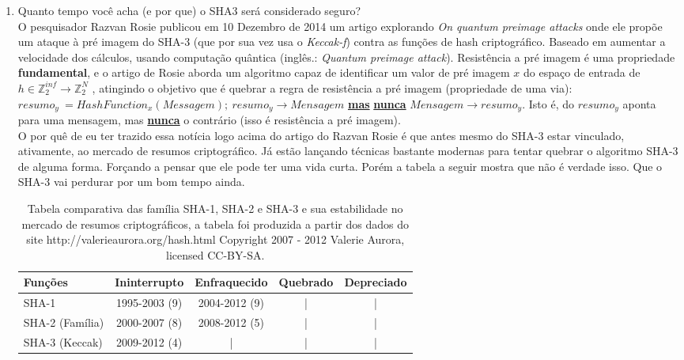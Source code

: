 \documentclass[12pt, a4paper]{article}
\begin{document}
\begin{enumerate}
\begin{enumerate}
    \item Quanto tempo você acha (e por que) o SHA3 será considerado seguro?\\

    O pesquisador Razvan Rosie publicou em 10 Dezembro de 2014 um artigo
    explorando \textit{On quantum preimage attacks} onde ele propõe um ataque à
    pré imagem do SHA-3 (que por sua vez usa o \textit{Keccak-f}) contra as
    funções de hash criptográfico. Baseado em aumentar a velocidade dos
    cálculos, usando computação quântica (inglês.: \textit{Quantum preimage
    attack}). Resistência a pré imagem é uma propriedade \textbf{fundamental}, e
    o artigo de Rosie aborda um algoritmo capaz de identificar um valor de pré
    imagem $x$ do espaço de entrada de $h \in \mathbb{Z}_{2}^{inf} \rightarrow
    \mathbb{Z}_{2}^{N}$ \cite{rosie14}, atingindo o objetivo que é quebrar a
    regra de resistência a pré imagem (propriedade de uma via): $resumo_y\ =
    HashFunction_x(Messagem);\ resumo_y \rightarrow Mensagem$
    \underline{\color{red} \textbf{mas}} \underline{\color{red} \textbf{nunca}}
    $Mensagem \rightarrow resumo_y$. Isto é, do $resumo_y$ aponta para uma
    mensagem, mas \textbf{\underline{nunca}} o contrário (isso é resistência a
    pré imagem).\\

    O por quê de eu ter trazido essa notícia logo acima do artigo do Razvan
    Rosie é que antes mesmo do SHA-3 estar vinculado, ativamente, ao mercado de
    resumos criptográfico. Já estão lançando técnicas bastante modernas para
    tentar quebrar o algoritmo SHA-3 de alguma forma. Forçando a pensar que ele
    pode ter uma vida curta. Porém a tabela a seguir mostra que não é verdade
    isso. Que o SHA-3 vai perdurar por um bom tempo ainda.\\

    \begin{table}[ht!]
      \centering
      \begin{tabular}{|l|c|c|c|c|}
        \hline Funções & Ininterrupto & Enfraquecido & Quebrado & Depreciado \\
        \hline SHA-1 & 1995-2003 (9) & 2004-2012 (9) & | & | \\
        \hline SHA-2 (Família) & 2000-2007 (8) & 2008-2012 (5) & | & | \\
        \hline SHA-3 (Keccak) & 2009-2012 (4) & | & | & | \\
        \hline
      \end{tabular}
      \caption{Tabela comparativa das família SHA-1, SHA-2 e SHA-3 e sua
      estabilidade no mercado de resumos criptográficos, a tabela foi produzida
      a partir dos dados do site http://valerieaurora.org/hash.html Copyright
      2007 - 2012 Valerie Aurora, licensed CC-BY-SA.}
    \end{table}


\end{enumerate}
\end{enumerate}
\end{document}
